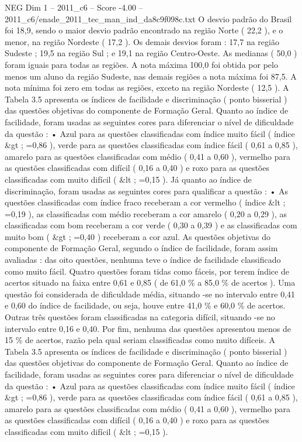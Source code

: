 \begin{textsample}{NEG Dim 1 – 2011\_c6 – Score -4.00 – 2011\_c6/enade\_2011\_tec\_man\_ind\_da8c9f098c.txt}
O desvio padrão do Brasil foi 18,9, sendo o maior desvio padrão encontrado na região Norte ( 22,2 ), e o menor, na região Nordeste ( 17,2 ).
Os demais desvios foram : 17,7 na região Sudeste ; 19,5 na região Sul ; e 19,1 na região Centro-Oeste.
As medianas ( 50,0 ) foram iguais para todas as regiões.
A nota máxima 100,0 foi obtida por pelo menos um aluno da região Sudeste, nas demais regiões a nota máxima foi 87,5.
A nota mínima foi zero em todas as regiões, exceto na região Nordeste ( 12,5 ).
A Tabela 3.5 apresenta os índices de facilidade e discriminação ( ponto bisserial ) das questões objetivas do componente de Formação Geral.
Quanto ao índice de facilidade, foram usadas as seguintes cores para diferenciar o nível de dificuldade da questão : • Azul para as questões classificadas com índice muito fácil ( índice \&gt ; =0,86 ), verde para as questões classificadas com índice fácil ( 0,61 a 0,85 ), amarelo para as questões classificadas com médio ( 0,41 a 0,60 ), vermelho para as questões classificadas com difícil ( 0,16 a 0,40 ) e roxo para as questões classificadas com muito difícil ( \&lt ; =0,15 ).
Já quanto ao índice de discriminação, foram usadas as seguintes cores para qualificar a questão : • As questões classificadas com índice fraco receberam a cor vermelho ( índice \&lt ; =0,19 ), as classificadas com médio receberam a cor amarelo ( 0,20 a 0,29 ), as classificadas com bom receberam a cor verde ( 0,30 a 0,39 ) e as classificadas com muito bom ( \&gt ; =0,40 ) receberam a cor azul.
As questões objetivas do componente de Formação Geral, segundo o índice de facilidade, foram assim avaliadas : das oito questões, nenhuma teve o índice de facilidade classificado como muito fácil.
Quatro questões foram tidas como fáceis, por terem índice de acertos situado na faixa entre 0,61 e 0,85 ( de 61,0 \% a 85,0 \% de acertos ).
Uma questão foi considerada de dificuldade média, situando -se no intervalo entre 0,41 e 0,60 do índice de facilidade, ou seja, houve entre 41,0 \% e 60,0 \% de acertos.
Outras três questões foram classificadas na categoria difícil, situando -se no intervalo entre 0,16 e 0,40.
Por fim, nenhuma das questões apresentou menos de 15 \% de acertos, razão pela qual seriam classificadas como muito difíceis.
A Tabela 3.5 apresenta os índices de facilidade e discriminação ( ponto bisserial ) das questões objetivas do componente de Formação Geral.
Quanto ao índice de facilidade, foram usadas as seguintes cores para diferenciar o nível de dificuldade da questão : • Azul para as questões classificadas com índice muito fácil ( índice \&gt ; =0,86 ), verde para as questões classificadas com índice fácil ( 0,61 a 0,85 ), amarelo para as questões classificadas com médio ( 0,41 a 0,60 ), vermelho para as questões classificadas com difícil ( 0,16 a 0,40 ) e roxo para as questões classificadas com muito difícil ( \&lt ; =0,15 ).

\end{textsample}
